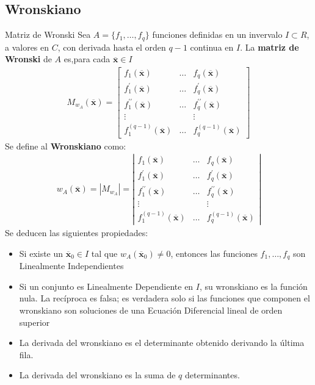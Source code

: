\documentclass[a4paper, twoside]{article}
\numberwithin{equation}{section}
\numberwithin{figure}{section}
\numberwithin{table}{section}
\newcommand{\vect}[1]{\overline{\textbf{#1}}}
\newcommand{\dete}[1]{\left\vert #1 \right\vert}
\begin{document}
\subsection{Wronskiano}
\begin{definicion*}{Matriz de Wronski}
	Sea $A=\{f_1,\ldots,f_q \}$ funciones definidas en un invervalo $I \subset R$, a valores en $C$, con derivada hasta el orden $q-1$ continua en $I$. La \textbf{matriz de Wronski} de $A$ es,para cada $\vect{x} \in I$
	\begin{align}
		M_{w_A} (\vect{x}) = 
			\begin{bmatrix}
				{f_1(\vect{x})} & {\ldots} & {f_q(\vect{x})} \\
				{f_1^\prime(\vect{x})} & {\ldots} & {f_q^\prime(\vect{x})} \\
				{f_1^{\prime\prime}(\vect{x})} & {\ldots} & {f_q^{\prime\prime}(\vect{x})} \\
				{\vdots} & { } & {\vdots} \\
				{f_1^{(q-1)}(\vect{x})} & {\ldots} & {f_q^{(q-1)}(\vect{x})}
			\end{bmatrix}
	\end{align}
	Se define al \textbf{Wronskiano} como:
	\begin{align}
		w_A (\vect{x}) = \dete{M_{w_A}} = \dete{
			\begin{matrix}
				{f_1(\vect{x})} & {\ldots} & {f_q(\vect{x})} \\
				{f_1^\prime(\vect{x})} & {\ldots} & {f_q^\prime(\vect{x})} \\
				{f_1^{\prime\prime}(\vect{x})} & {\ldots} & {f_q^{\prime\prime}(\vect{x})} \\
				{\vdots} & { } & {\vdots} \\
				{f_1^{(q-1)}(\vect{x})} & {\ldots} & {f_q^{(q-1)}(\vect{x})}
			\end{matrix}}
	\end{align}
	Se deducen las siguientes propiedades:
	\begin{itemize}
		\item Si existe un $\vect{x}_0 \in I$ tal que $w_A(\vect{x}_0) \neq 0$, entonces las funciones $f_1, \ldots,f_q$ son Linealmente Independientes 
		\item Si un conjunto es Linealmente Dependiente en $I$, su wronskiano es la función nula. La recíproca es falsa; es verdadera solo si las funciones que componen el wronskiano son soluciones de una Ecuación Diferencial lineal de orden superior
		\item La derivada del wronskiano es el determinante obtenido derivando la última fila.
		\item La derivada del wronskiano es la suma de $q$ determinantes.
	\end{itemize}
\end{definicion*}
\end{document}
